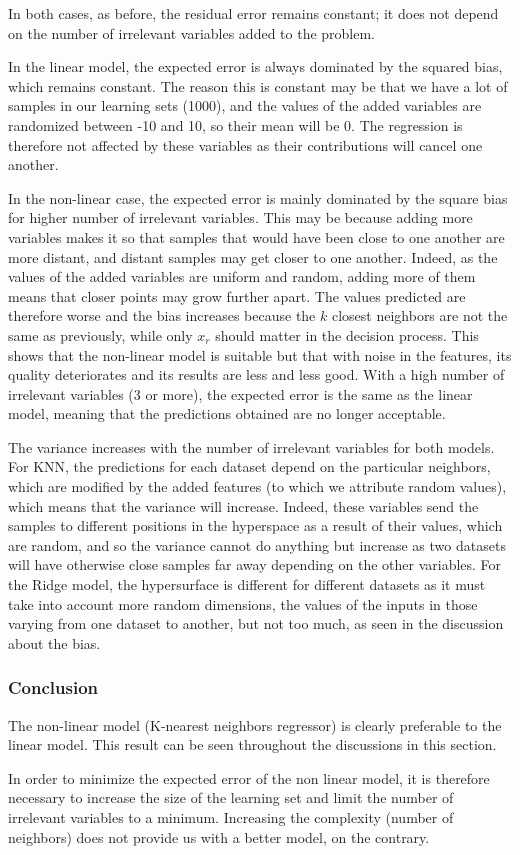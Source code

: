 In both cases, as before, the residual error remains constant; it does not depend on the number of irrelevant variables added to the problem.\par
In the linear model, the expected error is always dominated by the squared bias, which remains constant. The reason this is constant may be that we have a lot of samples in our learning sets (1000), and the values of the added variables are randomized between -10 and 10, so their mean will be 0. The regression is therefore not affected by these variables as their contributions will cancel one another.\par
In the non-linear case, the expected error is mainly dominated by the square bias for higher number of irrelevant variables. This may be because adding more variables makes it so that samples that would have been close to one another are more distant, and distant samples may get closer to one another. Indeed, as the values of the added variables are uniform and random, adding more of them means that closer points may grow further apart. The values predicted are therefore worse and the bias increases because the $k$ closest neighbors are not the same as previously, while only $x_r$ should matter in the decision process. This shows that the non-linear model is suitable but that with noise in the features, its quality deteriorates and its results are less and less good. With a high number of irrelevant variables (3 or more), the expected error is the same as the linear model, meaning that the predictions obtained are no longer acceptable.\par
The variance increases with the number of irrelevant variables for both models. For KNN, the predictions for each dataset depend on the particular neighbors, which are modified by the added features (to which we attribute random values), which means that the variance will increase. Indeed, these variables send the samples to different positions in the hyperspace as a result of their values, which are random, and so the variance cannot do anything but increase as two datasets will have otherwise close samples far away depending on the other variables. For the Ridge model, the hypersurface is different for different datasets as it must take into account more random dimensions, the values of the inputs in those varying from one dataset to another, but not too much, as seen in the discussion about the bias.

\subsubsection*{Conclusion}
The non-linear model (K-nearest neighbors regressor) is clearly preferable to the linear model. This result can be seen throughout the discussions in this section.\par
In order to minimize the expected error of the non linear model, it is therefore necessary to increase the size of the learning set and limit the number of irrelevant variables to a minimum. Increasing the complexity (number of neighbors) does not provide us with a better model, on the contrary.
